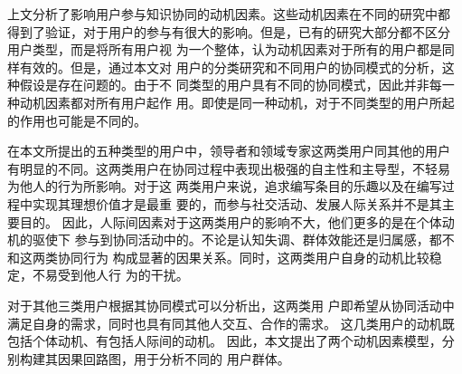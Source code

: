 上文分析了影响用户参与知识协同的动机因素。这些动机因素在不同的研究中都
得到了验证，对于用户的参与有很大的影响。但是，已有的研究大部分都不区分
用户类型，而是将所有用户视
为一个整体，认为动机因素对于所有的用户都是同样有效的。但是，通过本文对
用户的分类研究和不同用户的协同模式的分析，这种假设是存在问题的。由于不
同类型的用户具有不同的协同模式，因此并非每一种动机因素都对所有用户起作
用。即使是同一种动机，对于不同类型的用户所起的作用也可能是不同的。

在本文所提出的五种类型的用户中，领导者和领域专家这两类用户同其他的用户
有明显的不同。这两类用户在协同过程中表现出极强的自主性和主导型，不轻易
为他人的行为所影响。对于这
两类用户来说，追求编写条目的乐趣以及在编写过程中实现其理想价值才是最重
要的，而参与社交活动、发展人际关系并不是其主要目的\cite{Rafaeli2008}。
因此，人际间因素对于这两类用户的影响不大，他们更多的是在个体动机的驱使下
参与到协同活动中的。不论是认知失调、群体效能还是归属感，都不和这两类协同行为
构成显著的因果关系。同时，这两类用户自身的动机比较稳定，不易受到他人行
为的干扰。

对于其他三类用户根据其协同模式可以分析出，这两类用
户即希望从协同活动中满足自身的需求，同时也具有同其他人交互、合作的需求。
这几类用户的动机既包括个体动机、有包括人际间的动机。
因此，本文提出了两个动机因素模型，分别构建其因果回路图，用于分析不同的
用户群体。

